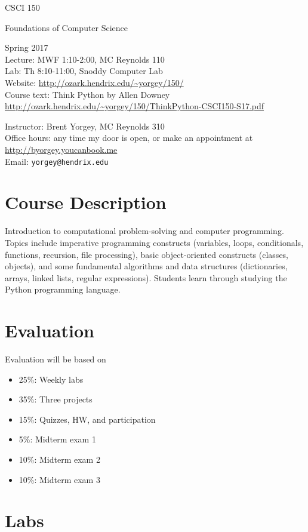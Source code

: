 \documentclass{article}
\begin{document}
{\Large
\noindent CSCI 150 \smallskip

\noindent Foundations of Computer Science \bigskip
}

\noindent Spring 2017 \\
Lecture: MWF 1:10-2:00, MC Reynolds 110\\
Lab: Th 8:10-11:00, Snoddy Computer Lab\\
Website: \url{http://ozark.hendrix.edu/~yorgey/150/} \\
Course text: Think Python by Allen Downey \\
\indent \url{http://ozark.hendrix.edu/~yorgey/150/ThinkPython-CSCI150-S17.pdf}
\medskip

\noindent Instructor: Brent Yorgey, MC Reynolds 310 \\
Office hours: any time my door is open, or make an appointment at \\
\indent \url{http://byorgey.youcanbook.me} \\
Email: \texttt{yorgey@hendrix.edu} \medskip

\section*{Course Description}

Introduction to computational problem-solving and computer
programming. Topics include imperative programming constructs
(variables, loops, conditionals, functions, recursion, file
processing), basic object-oriented constructs (classes, objects), and
some fundamental algorithms and data structures (dictionaries, arrays,
linked lists, regular expressions). Students learn through studying
the Python programming language.

\section*{Evaluation}

Evaluation will be based on
\begin{itemize}
\item 25\%: Weekly labs
\item 35\%: Three projects
\item 15\%: Quizzes, HW, and participation
\item 5\%: Midterm exam 1
\item 10\%: Midterm exam 2
\item 10\%: Midterm exam 3
\end{itemize}

\section*{Labs}
\end{document}
